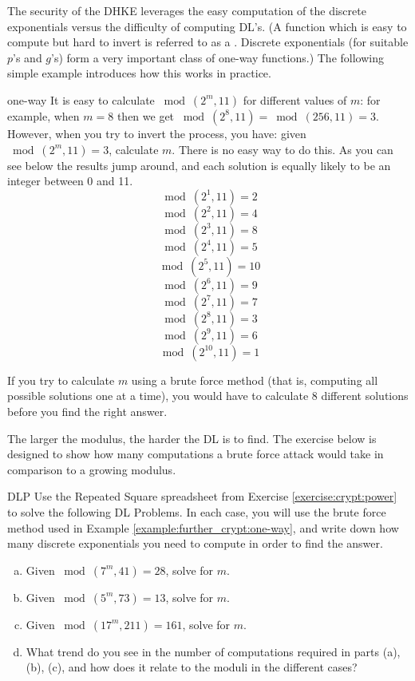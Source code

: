 The security of the DHKE leverages the easy computation of the discrete exponentials versus the difficulty of computing DL's. (A function which is easy to compute but hard to invert is referred to as a . Discrete exponentials (for suitable $p$'s and $g$'s) form a very important class of one-way functions.)
The following simple example introduces how this works in practice. 

\begin{example}{one-way}
It is easy to calculate $\bmod(2^{m},  11)$ for different values of $m$: for example, when $m =8$ then we get $\bmod(2^{8},  11) =\bmod(256,  11)  = 3$.  However, when you try to invert the process, you have: given $\bmod(2^{m},  11) = 3$, calculate $m$. There is no easy way to do this. As you can see below the results jump around, and each solution is equally likely to be an integer between 0 and 11. 
$$ \bmod(2^{1}, 11)=2$$
$$ \bmod(2^{2}, 11)=4$$
$$ \bmod(2^{3}, 11)=8$$
$$ \bmod(2^{4}, 11)=5$$
$$ \bmod(2^{5}, 11)=10$$
$$ \bmod(2^{6}, 11)=9$$
$$ \bmod(2^{7}, 11)=7$$
$$ \bmod(2^{8}, 11)=3$$
$$ \bmod(2^{9}, 11)=6$$
$$ \bmod(2^{10}, 11)=1$$
\end{example}
If you try to calculate $m$ using a brute force method (that is, computing all possible solutions one at a time), you would have to calculate 8 different solutions before you find the right answer. 

The larger the modulus, the harder the DL is to find. The exercise below is designed to show how many computations a brute force attack would take in comparison to a growing modulus.

\begin{exercise}{DLP}
Use the Repeated Square spreadsheet from Exercise \ref{exercise:crypt:power} to solve the following DL Problems. In each case, you will use the brute force method used in Example \ref{example:further_crypt:one-way}, and write down how many discrete exponentials you need to compute in order to find the answer.  
\begin{enumerate}[(a)]
\item Given $ \bmod(7^{m}, 41)=28$, solve for $m$.

\item Given $ \bmod(5^{m}, 73)=13$, solve for $m$.

\item Given $ \bmod(17^{m}, 211)=161$, solve for $m$.

\item
What trend do you see in the number of computations required in parts (a), (b), (c), and how does it relate to the moduli in the different cases?
\end{enumerate}
\end{exercise}

